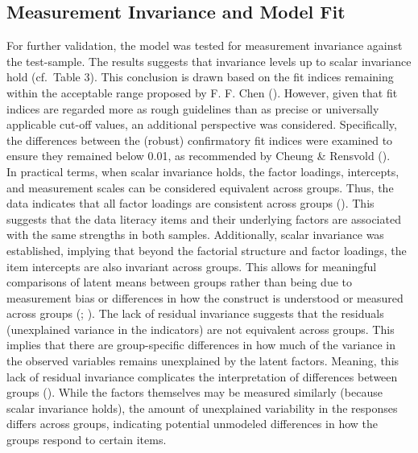 \documentclass[
  12pt,
  a4paper,
  twoside]{article}
\begin{document}
\subsection{Measurement Invariance and Model Fit}\label{measurement-invariance-and-model-fit}

For further validation, the model was tested for measurement invariance against the test-sample.
The results suggests that invariance levels up to scalar invariance hold (cf.~Table 3).
This conclusion is drawn based on the fit indices remaining within the acceptable range proposed by F. F. Chen ().
However, given that fit indices are regarded more as rough guidelines than as precise or universally applicable cut-off values, an additional perspective was considered.
Specifically, the differences between the (robust) confirmatory fit indices were examined to ensure they remained below 0.01, as recommended by Cheung \& Rensvold ().\\
In practical terms, when scalar invariance holds, the factor loadings, intercepts, and measurement scales can be considered equivalent across groups.
Thus, the data indicates that all factor loadings are consistent across groups ().
This suggests that the data literacy items and their underlying factors are associated with the same strengths in both samples. Additionally, scalar invariance was established, implying that beyond the factorial structure and factor loadings, the item intercepts are also invariant across groups.
This allows for meaningful comparisons of latent means between groups rather than being due to measurement bias or differences in how the construct is understood or measured across groups (; ).
The lack of residual invariance suggests that the residuals (unexplained variance in the indicators) are not equivalent across groups. This implies that there are group-specific differences in how much of the variance in the observed variables remains unexplained by the latent factors. Meaning, this lack of residual invariance complicates the interpretation of differences between groups (). While the factors themselves may be measured similarly (because scalar invariance holds), the amount of unexplained variability in the responses differs across groups, indicating potential unmodeled differences in how the groups respond to certain items.
\end{document}
